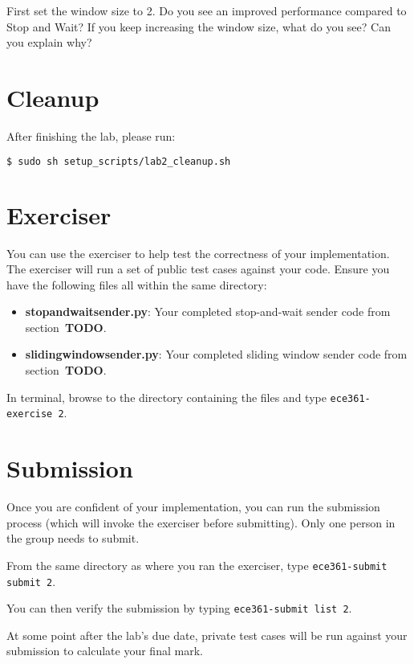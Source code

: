 \documentclass[11pt]{article}
\def\thelab{2}
\begin{document}
First set the window size to 2. Do you see an improved performance compared to Stop and Wait? If you keep increasing the window size, what do you see? Can you explain why?

\section{Cleanup}
After finishing the lab, please run:
\begin{lstlisting}[language=bash]
$ sudo sh setup_scripts/lab2_cleanup.sh
\end{lstlisting}

\section{Exerciser}
\label{sec:exercise}
You can use the exerciser to help test the correctness of your implementation. The exerciser will run a set of public test cases against your code.
Ensure you have the following files all within the same directory:
\begin{itemize}
    \item \textbf{stopandwaitsender.py}: Your completed stop-and-wait sender code from section~\textbf{TODO}.
    \item \textbf{slidingwindowsender.py}: Your completed sliding window sender code from section~\textbf{TODO}.
\end{itemize}

In terminal, browse to the directory containing the files and type \texttt{ece361-exercise \thelab}.


\section{Submission}
\label{sec:submission}
Once you are confident of your implementation, you can run the submission process (which will invoke the exerciser before submitting).
Only one person in the group needs to submit.

From the same directory as where you ran the exerciser, type \texttt{ece361-submit submit \thelab}.

You can then verify the submission by typing \texttt{ece361-submit list \thelab}.

At some point after the lab's due date, private test cases will be run against your submission to calculate your final mark.
\end{document}

